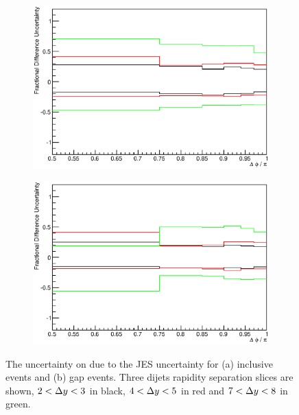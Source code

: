 \begin{figure}
\centering
        \begin{subfigure}[b]{0.5\textwidth}
                \centering
                \includegraphics[width=\textwidth]{figures/GBJ2/JES/Smeared__dPhi__7_8.eps}
        \end{subfigure}%
        \begin{subfigure}[b]{0.5\textwidth}
                \centering
                \includegraphics[width=\textwidth]{figures/GBJ2/JES/Smeared__dPhi_gap__7_8.eps}
        \end{subfigure}%
\caption[Uncertainty bands due to the JES uncertainty for \dphiDist{}]{
The uncertainty on \dphiDist{} due to the JES uncertainty for (a) inclusive events and (b) gap events. 
Three dijets rapidity separation slices are shown, $2<\mbox{$\Delta y$}{}<3$ in black, $4<\mbox{$\Delta y$}{}<5$ in red and $7<\mbox{$\Delta y$}{}<8$ in green.
\label{GBJ2:JES:dPhi}}
\end{figure}


